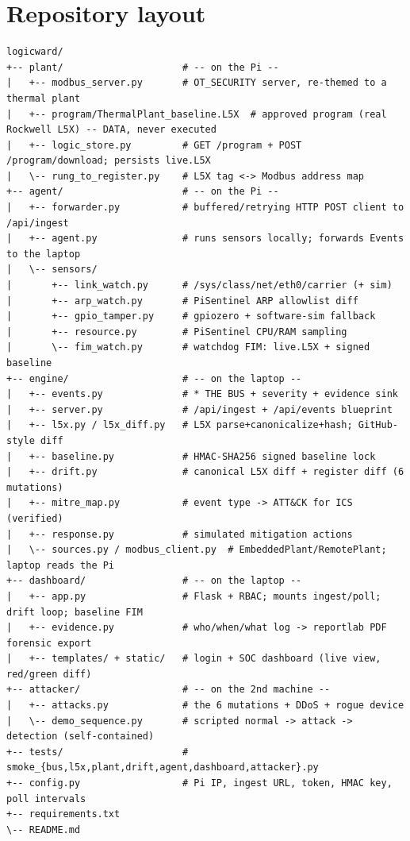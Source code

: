 \documentclass[11pt,a4paper]{article}
\begin{document}
\section{Repository layout}
\begin{lstlisting}
logicward/
+-- plant/                     # -- on the Pi --
|   +-- modbus_server.py       # OT_SECURITY server, re-themed to a thermal plant
|   +-- program/ThermalPlant_baseline.L5X  # approved program (real Rockwell L5X) -- DATA, never executed
|   +-- logic_store.py         # GET /program + POST /program/download; persists live.L5X
|   \-- rung_to_register.py    # L5X tag <-> Modbus address map
+-- agent/                     # -- on the Pi --
|   +-- forwarder.py           # buffered/retrying HTTP POST client to /api/ingest
|   +-- agent.py               # runs sensors locally; forwards Events to the laptop
|   \-- sensors/
|       +-- link_watch.py      # /sys/class/net/eth0/carrier (+ sim)
|       +-- arp_watch.py       # PiSentinel ARP allowlist diff
|       +-- gpio_tamper.py     # gpiozero + software-sim fallback
|       +-- resource.py        # PiSentinel CPU/RAM sampling
|       \-- fim_watch.py       # watchdog FIM: live.L5X + signed baseline
+-- engine/                    # -- on the laptop --
|   +-- events.py              # * THE BUS + severity + evidence sink
|   +-- server.py              # /api/ingest + /api/events blueprint
|   +-- l5x.py / l5x_diff.py   # L5X parse+canonicalize+hash; GitHub-style diff
|   +-- baseline.py            # HMAC-SHA256 signed baseline lock
|   +-- drift.py               # canonical L5X diff + register diff (6 mutations)
|   +-- mitre_map.py           # event type -> ATT&CK for ICS (verified)
|   +-- response.py            # simulated mitigation actions
|   \-- sources.py / modbus_client.py  # EmbeddedPlant/RemotePlant; laptop reads the Pi
+-- dashboard/                 # -- on the laptop --
|   +-- app.py                 # Flask + RBAC; mounts ingest/poll; drift loop; baseline FIM
|   +-- evidence.py            # who/when/what log -> reportlab PDF forensic export
|   +-- templates/ + static/   # login + SOC dashboard (live view, red/green diff)
+-- attacker/                  # -- on the 2nd machine --
|   +-- attacks.py             # the 6 mutations + DDoS + rogue device
|   \-- demo_sequence.py       # scripted normal -> attack -> detection (self-contained)
+-- tests/                     # smoke_{bus,l5x,plant,drift,agent,dashboard,attacker}.py
+-- config.py                  # Pi IP, ingest URL, token, HMAC key, poll intervals
+-- requirements.txt
\-- README.md
\end{lstlisting}
\end{document}
